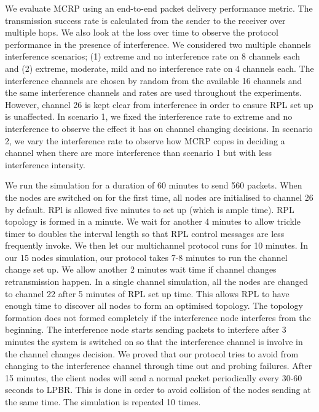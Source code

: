 



We evaluate MCRP using an end-to-end packet delivery performance metric. The transmission success rate is calculated from the sender to the receiver over multiple hops. We also look at the loss over time to observe the protocol performance in the presence of interference. We considered two multiple channels interference scenarios; (1) extreme and no interference rate on 8 channels each and (2) extreme, moderate, mild and no interference rate on 4 channels each. The interference channels are chosen by random from the available 16 channels and the same interference channels and rates are used throughout the experiments. However, channel 26 is kept clear from interference in order to ensure RPL set up is unaffected. In scenario 1, we fixed the interference rate to extreme and no interference to observe the effect it has on channel changing decisions. In scenario 2, we vary the interference rate to observe how MCRP copes in deciding a channel when there are more interference than scenario 1 but with less interference intensity. 


We run the simulation for a duration of 60 minutes to send 560 packets. When the nodes are switched on for the first time, all nodes are initialised to channel 26 by default. RPl is allowed five minutes to set up (which is ample time). RPL topology is formed in a minute. We wait for another 4 minutes to allow trickle timer to doubles the interval length so that RPL control messages are less frequently invoke. We then let our multichannel protocol runs for 10 minutes. In our 15 nodes simulation, our protocol takes 7-8 minutes to run the channel change set up. We allow another 2 minutes wait time if channel changes retransmission happen. In a single channel simulation, all the nodes are changed to channel 22 after 5 minutes of RPL set up time. This allows RPL to have enough time to discover all nodes to form an optimised topology. The topology formation does not formed completely if the interference node interferes from the beginning. The interference node starts sending packets to interfere after 3 minutes the system is switched on so that the interference channel is involve in the channel changes decision. We proved that our protocol tries to avoid from changing to the interference channel through time out and probing failures. After 15 minutes, the client nodes will send a normal packet periodically every 30-60 seconds to LPBR. This is done in order to avoid collision of the nodes sending at the same time. The simulation is repeated 10 times.

